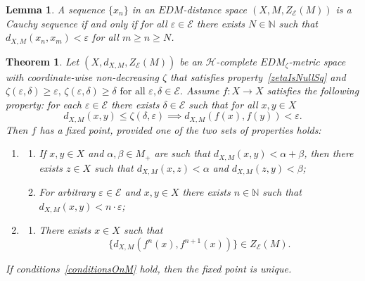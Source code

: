 \documentclass[10pt,a4paper]{amsart}
\newtheorem{lemma}{Lemma}
\newtheorem{theorem}{Theorem}
\newcommand{\EE}{\mathcal{E}}
\newcommand{\NN}{\mathbb N}
\begin{document}
 \begin{lemma}\label{l::eCauchySequence}
 A sequence $\{x_n\}$ in an $EDM$-distance space $(X, M, Z_{\EE}(M))$ is a Cauchy sequence if and only if for all $\varepsilon\in\EE$ there exists $N\in\NN$ such that $d_{X,M}(x_n,x_m)<\varepsilon$ for all $m\geq n\geq N$.
 \end{lemma}

\begin{theorem}\label{th::M-KContraction}
Let $(X,d_{X,M},Z_{\EE}(M))$ be an $\mathcal{H}$-complete $EDM_\zeta$-metric space with coordinate-wise non-decreasing $\zeta$ that satisfies property~\eqref{zetaIsNullSq} and 
$
\zeta(\varepsilon,\delta)\geq \varepsilon,\, \zeta(\varepsilon,\delta)\geq \delta \text{ for all } \varepsilon, \delta\in \EE.
$
Assume $f\colon X\to X$ satisfies the following property: for each $\varepsilon\in \EE$ there exists $\delta\in \EE$ such that for all $x,y\in X$ 
\begin{equation}\label{taylor2}          d_{X,M}(x,y)\leq \zeta( \delta, \varepsilon) \implies d_{X,M}(f(x),f(y))<\varepsilon.
\end{equation}
Then $f$ has a fixed point, provided one of the two sets of properties holds:
\begin{enumerate}[label = \Roman*]
\item\label{conditionsOnM}
\begin{enumerate}
    \item\label{taylorUniqueness1} If $x,y\in X$ and $\alpha, \beta\in M_+$ are such that $d_{X,M}(x,y)< \alpha+\beta$, then there exists $z\in X$ such that $d_{X,M}(x,z) < \alpha$ and $d_{X,M}(z,y) < \beta$;
    \item\label{taylorUniqueness2} For arbitrary $\varepsilon\in \EE$ and $x,y\in X$ there exists $n\in\NN$ such that $d_{X,M}(x,y)< n\cdot \varepsilon$;
\end{enumerate}
\item \label{conditionsOnF}
\begin{enumerate}
    \item  There exists $x\in X$ such that 
\begin{equation}\label{taylor1}
  \{  d_{X,M}(f^n(x),f^{n+1}(x))\}\in Z_{\EE}(M).
\end{equation} 
\end{enumerate}
\end{enumerate}
If conditions~\ref{conditionsOnM} hold, then the fixed point is unique.
\end{theorem}
\end{document}
